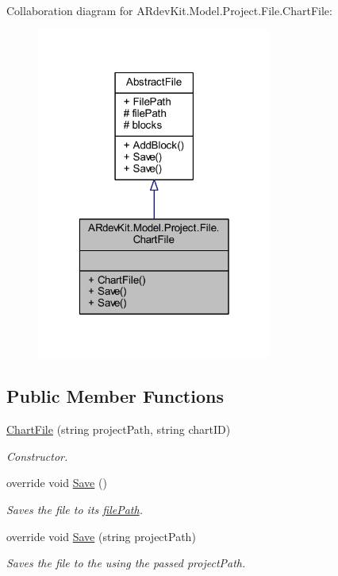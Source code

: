 Collaboration diagram for A\-Rdev\-Kit.\-Model.\-Project.\-File.\-Chart\-File\-:
\nopagebreak
\begin{figure}[H]
\begin{center}
\leavevmode
\includegraphics[width=220pt]{class_a_rdev_kit_1_1_model_1_1_project_1_1_file_1_1_chart_file__coll__graph}
\end{center}
\end{figure}
\subsection*{Public Member Functions}
\begin{DoxyCompactItemize}
\item 
\hyperlink{class_a_rdev_kit_1_1_model_1_1_project_1_1_file_1_1_chart_file_a92735bc01ffce6880f8d0f0e2cf499fb}{Chart\-File} (string project\-Path, string chart\-I\-D)
\begin{DoxyCompactList}\small\item\em Constructor. \end{DoxyCompactList}\item 
override void \hyperlink{class_a_rdev_kit_1_1_model_1_1_project_1_1_file_1_1_chart_file_aa19af3145e3bbcb28683e7c77571d06f}{Save} ()
\begin{DoxyCompactList}\small\item\em Saves the file to its \hyperlink{class_a_rdev_kit_1_1_model_1_1_project_1_1_file_1_1_abstract_file_ad879e3a81860da8b72f2d9f61a18ab3b}{file\-Path}. \end{DoxyCompactList}\item 
override void \hyperlink{class_a_rdev_kit_1_1_model_1_1_project_1_1_file_1_1_chart_file_a8a52e5730191b832eb8664016e7bda7f}{Save} (string project\-Path)
\begin{DoxyCompactList}\small\item\em Saves the file to the using the passed project\-Path. \end{DoxyCompactList}\end{DoxyCompactItemize}
